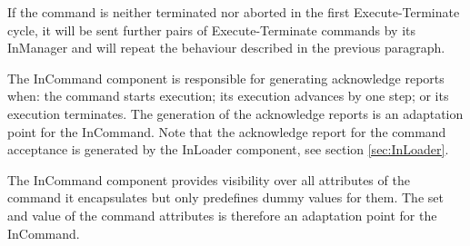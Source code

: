 If the command is neither terminated nor aborted in the first Execute-Terminate cycle, it will be sent further pairs of Execute-Terminate commands by its InManager and will repeat the behaviour described in the previous paragraph.  

The InCommand component is responsible for generating acknowledge reports when: the command starts execution; its execution advances by one step; or its execution terminates. The generation of the acknowledge reports is an adaptation point for the InCommand. Note that the acknowledge report for the command acceptance is generated by the InLoader component, see section \ref{sec:InLoader}.

The InCommand component provides visibility over all attributes of the command it encapsulates but only predefines dummy values for them. The set and value of the command attributes is therefore an adaptation point for the InCommand.

